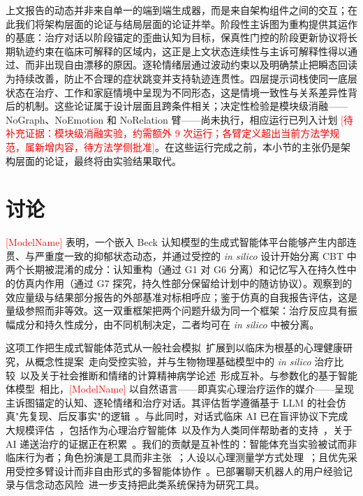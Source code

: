 \documentclass[11pt,a4paper]{article}
\newcommand{\ph}[1]{\textcolor{red}{[#1]}}
\begin{document}
上文报告的动态并非来自单一的端到端生成器，而是来自架构组件之间的交互；在此我们将架构层面的论证与结局层面的论证并举。阶段性主诉图为重构提供其运作的基底：治疗对话以阶段锚定的歪曲认知为目标，保真性门控的阶段更新协议将长期轨迹约束在临床可解释的区域内，这正是上文状态连续性与主诉可解释性得以通过、而非出现自由漂移的原因。逐轮情绪层通过波动约束以及明确禁止把瞬态回读为持续改善，防止不合理的症状跳变并支持轨迹连贯性。四层提示词栈使同一底层状态在治疗、工作和家庭情境中呈现为不同形态，这是情境一致性与关系差异性背后的机制。这些论证属于设计层面且跨条件相关；决定性检验是模块级消融——NoGraph、NoEmotion 和 NoRelation 臂——尚未执行，相应运行已列入计划 \ph{待补充证据：模块级消融实验，约需额外 9 次运行；各臂定义超出当前方法学规范，属新增内容，待方法学侧批准}。在这些运行完成之前，本小节的主张仍是架构层面的论证，最终将由实验结果取代。

\section{讨论}\label{sec:discussion}

\ph{ModelName} 表明，一个嵌入 Beck 认知模型的生成式智能体平台能够产生内部连贯、与严重度一致的抑郁状态动态，并通过受控的 \emph{in silico} 设计开始分离 CBT 中两个长期被混淆的成分：认知重构（通过 G1 对 G6 分离）和记忆写入在持久性中的仿真内作用（通过 G7 探究，持久性部分保留给计划中的随访协议）。观察到的效应量级与结果部分报告的外部基准对标相呼应；鉴于仿真的自我报告评估，这是量级参照而非等效。这一双重框架把两个问题升级为同一个框架：治疗反应具有振幅成分和持久性成分，由不同机制决定，二者均可在 \emph{in silico} 中被分离。

这项工作把生成式智能体范式从一般社会模拟~\cite{park2023,gao2024}扩展到以临床为根基的心理健康研究，从概念性提案~\cite{kambeitz2025npj,doraiswamy2025,rhoads2024}走向受控实验，并与生物物理基础模型中的 \emph{in silico} 治疗比较~\cite{deco2024}以及关于社会推断和情绪的计算精神病学论述~\cite{barnby2024,trier2025,zavlis2025}形成互补。与参数化的基于智能体模型~\cite{bonabeau2002}相比，\ph{ModelName} 以自然语言——即真实心理治疗运作的媒介——呈现主诉图锚定的认知、逐轮情绪和治疗对话。其评估哲学遵循基于 LLM 的社会仿真"先复现、后反事实"的逻辑~\cite{qu2024,ji2026}。与此同时，对话式临床 AI 已在盲评协议下完成大规模评估~\cite{tu2025,saab2026,johri2025}，包括作为心理治疗智能体~\cite{rollwage2026}以及作为人类同伴帮助者的支持~\cite{sharma2023}，关于 AI 递送治疗的证据正在积累~\cite{heinz2025,hang2026,hua2025,stade2024}。我们的贡献是互补性的：智能体充当实验被试而非临床行为者；角色扮演是工具而非主张~\cite{shanahan2023}；人设以心理测量学方式处理~\cite{serapio2025,wright2026}；且优先采用受控多臂设计而非自由形式的多智能体协作~\cite{kim2026}。已部署聊天机器人的用户经验记录与信念动态风险~\cite{maples2024,siddals2024,dohany2026}进一步支持把此类系统保持为研究工具。
\end{document}
